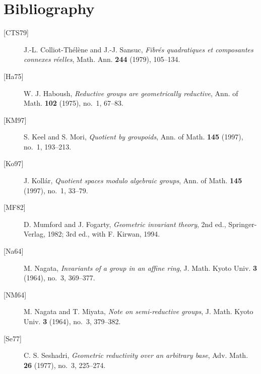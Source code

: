 \section*{Bibliography}

\begin{description}
\item[{[CTS79]}] J.-L. Colliot-Th\'el\`ene and J.-J. Sansuc,
  \emph{Fibr\'es quadratiques et composantes connexes r\'eelles}, Math. Ann.
  \textbf{244} (1979), 105--134.
\item[{[Ha75]}] W. J. Haboush, \emph{Reductive groups are geometrically
  reductive}, Ann. of Math. \textbf{102} (1975), no.~1, 67--83.
\item[{[KM97]}] S. Keel and S. Mori, \emph{Quotient by groupoids}, Ann. of Math.
  \textbf{145} (1997), no.~1, 193--213.
\item[{[Ko97]}] J. Koll\'ar, \emph{Quotient spaces modulo algebraic groups}, Ann.
  of Math. \textbf{145} (1997), no.~1, 33--79.
\item[{[MF82]}] D. Mumford and J. Fogarty, \emph{Geometric invariant theory},
  2nd ed., Springer-Verlag, 1982; 3rd ed., with F. Kirwan, 1994.
\item[{[Na64]}] M. Nagata, \emph{Invariants of a group in an affine ring},
  J. Math. Kyoto Univ. \textbf{3} (1964), no.~3, 369--377.
\item[{[NM64]}] M. Nagata and T. Miyata, \emph{Note on semi-reductive groups},
  J. Math. Kyoto Univ. \textbf{3} (1964), no.~3, 379--382.
\item[{[Se77]}] C. S. Seshadri, \emph{Geometric reductivity over an arbitrary
  base}, Adv. Math. \textbf{26} (1977), no.~3, 225--274.
\end{description}

\endgroup

